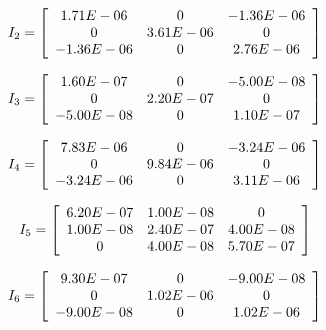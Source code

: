\begin{equation*}
    \hspace{-10mm}
    I_2 = \left[
        \begin{array}{ccc}
        
        1.71E-06&0&-1.36E-06\\
        0&3.61E-06&0\\
        -1.36E-06&0&2.76E-06\\
        
        \end{array}\right]\hspace{10mm}
\end{equation*}

\begin{equation*}
    \hspace{-10mm}
    I_3 = \left[
        \begin{array}{ccc}
        
        1.60E-07&0&-5.00E-08\\
        0&2.20E-07&0\\
        -5.00E-08&0&1.10E-07\\
        
        \end{array}\right]\hspace{10mm}
\end{equation*}

\begin{equation*}
    \hspace{-10mm}
    I_4 = \left[
        \begin{array}{ccc}
        
        7.83E-06&0&-3.24E-06\\
        0&9.84E-06&0\\
        -3.24E-06&0&3.11E-06\\
        
        \end{array}\right]\hspace{10mm}
\end{equation*}

\begin{equation*}
    \hspace{-10mm}
    I_5 = \left[
        \begin{array}{ccc}

        6.20E-07&1.00E-08&0\\
        1.00E-08&2.40E-07&4.00E-08\\
        0&4.00E-08&5.70E-07\\
        
        \end{array}\right]\hspace{10mm}
\end{equation*}

\begin{equation*}
    \hspace{-10mm}
    I_6 = \left[
        \begin{array}{ccc}
        
        9.30E-07&0&-9.00E-08\\
        0&1.02E-06&0\\
        -9.00E-08&0&1.02E-06\\
        
        \end{array}\right]\hspace{10mm}
\end{equation*}